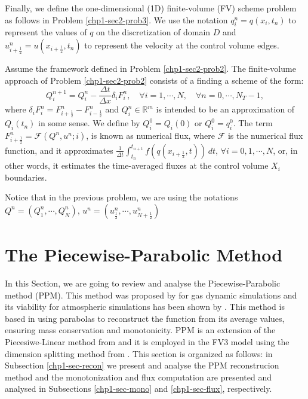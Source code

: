 Finally, we define the one-dimensional (1D) finite-volume (FV)
scheme problem as follows in Problem \ref{chp1-sec2-prob3}.
We use the notation ${q}^n_{i} = {q}(x_i, t_n)$
to represent the values of ${q}$ on the discretization of domain $D$
and $u_{i+\frac{1}{2}}^n = u(x_{i+\frac{1}{2}},t_n)$
to represent the velocity at the control volume edges.
\begin{prob}[1D-FV scheme]
	\label{chp1-sec2-prob3}
	Assume the framework defined in Problem \ref{chp1-sec2-prob2}.
	The finite-volume approach of Problem \ref{chp1-sec2-prob2}
	consists of a finding a scheme of the form:
        \begin{equation*}
		{Q}_{i}^{n+1} =  {Q}_{i}^{n} -
            \frac{\Delta t}{\Delta x} \delta_i {F}_{i}^{n},
                \quad \forall i = 1, \cdots, N,
                \quad \forall n = 0, \cdots, N_T-1,
        \end{equation*}
	where $\delta_i {F}_{i}^{n} = 
    {F}_{i+\frac{1}{2}}^{n} - {F}_{i-\frac{1}{2}}^{n}$
    and ${Q}_{i}^{n} \in \mathbb{R}^m$ is intended to be an approximation
	of ${Q}_i(t_{n})$ in some sense. We define by
    ${Q}_{i}^{0} = {Q}_i(0)$ or ${Q}_{i}^{0} = {q}^{0}_{i}$. 
	The term ${F}_{i+\frac{1}{2}}^{n} = \mathcal{F}
    (Q^{n}, u^n ;i)$, is known as numerical flux, where $\mathcal{F}$ 
    is the numerical flux function, and it approximates
	$\frac{1}{\Delta t}\int_{t_n}^{t_{n+1}} 
    {f}({q}(x_{i+\frac{1}{2}}, t)) \,dt $,
	$\forall i = 0, 1, \cdots, N$,
	or, in other words, it estimates the time-averaged fluxes at
    the control volume $X_i$ boundaries.
\end{prob}
Notice that in the previous problem,
we are using the notations 
$Q^n = (Q_1^n, \cdots, Q_N^n)$,
$u^n = (u_{\frac{1}{2}}^n, \cdots, u_{N+\frac{1}{2}}^n)$


\section{The Piecewise-Parabolic Method}
\label{chp1-sec-ppm}
In this Section, we are going to review and analyse the Piecewise-Parabolic method (PPM).
This method was proposed by \citet{colella:1984} for gas dynamic simulations and
its viability for atmospheric simulations has been shown by \citet{carpenter:1990}.
This method is based in using parabolas to reconstruct the function from its 
average values, ensuring mass conservation and monotonicity.
PPM is an extension of the Piecesiwe-Linear method from \citet{vanleer:1977}
and it is employed in the FV3 model using the dimension splitting method from \citet{lin:1996}.
This section is organized as follows: in Subsection \ref{chp1-sec-recon} 
we present and analyse the PPM reconstrucion method and the monotonization and 
flux computation are presented and analysed in Subsections 
\ref{chp1-sec-mono} and \ref{chp1-sec-flux}, respectively.


